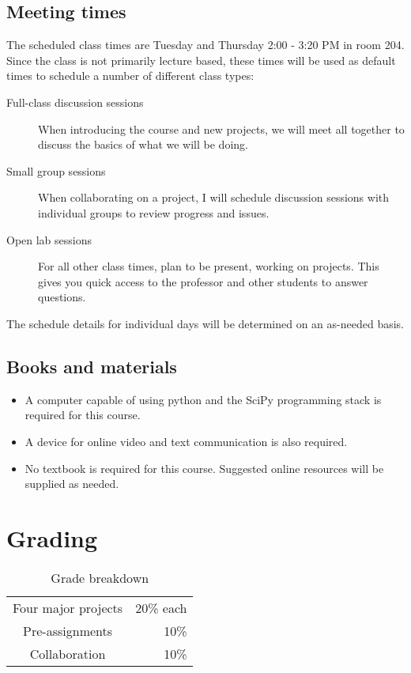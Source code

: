 \documentclass[12pt]{article}
\begin{document}
\subsection*{Meeting times}

The scheduled class times are Tuesday and Thursday 2:00 - 3:20 PM in room 204. Since the class is not primarily lecture based, these times will be used as default times to schedule a number of different class types:
\begin{description}
\item[Full-class discussion sessions] When introducing the course and new projects, we will meet all together to discuss the basics of what we will be doing.
\item[Small group sessions] When collaborating on a project, I will schedule discussion sessions with individual groups to review progress and issues.
\item[Open lab sessions] For all other class times, plan to be present, working on projects. This gives you quick access to the professor and other students to answer questions.
\end{description}
The schedule details for individual days will be determined on an as-needed basis.

\subsection*{Books and materials}

\begin{itemize}
\item A computer capable of using python and the SciPy programming stack is required for this course.
\item A device for online video and text communication is also required.
\item No textbook is required for this course. Suggested online resources will be supplied as needed.
\end{itemize}

\section*{Grading}

\begin{table}[h]
  \caption{Grade breakdown}
\begin{center}
  \begin{tabular}{cr}
	\toprule
    Four major projects & 20\% each \\
    Pre-assignments & 10\% \\
    Collaboration & 10\% \\
    \bottomrule
  \end{tabular}
\end{center}
\end{table}
\end{document}
